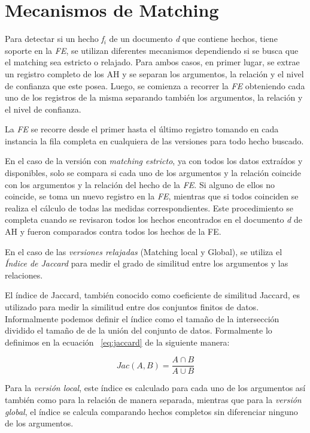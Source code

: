 \section{Mecanismos de Matching}
Para detectar si un hecho \emph{f${_i}$} de un documento \emph{d} que contiene hechos, tiene soporte en la \emph{FE}, se utilizan diferentes mecanismos dependiendo si se busca que el matching sea estricto o relajado.
Para ambos casos, en primer lugar, se extrae un registro completo de los AH y se separan los argumentos, la relaci\'on y el nivel de confianza que este posea. Luego, se comienza a recorrer la \emph{FE} obteniendo cada uno de los registros de la misma separando tambi\'en los argumentos, la relaci\'on y el nivel de confianza.

La \emph{FE} se recorre desde el primer hasta el \'ultimo registro tomando en cada instancia la fila completa en cualquiera de las versiones para todo hecho buscado.

En el caso de la versi\'on con \emph{matching estricto}, ya con todos los datos extra\'idos y disponibles, solo se compara si cada uno de los argumentos y la relaci\'on coincide con los argumentos y la relaci\'on del hecho de la \emph{FE}. Si alguno de ellos no coincide, se toma un nuevo registro en la \emph{FE}, mientras que si todos coinciden  se realiza el c\'alculo de todas las medidas correspondientes.
Este procedimiento se completa cuando se revisaron todos los hechos encontrados en el documento \emph{d} de AH y fueron comparados contra todos los hechos de la FE.

En el caso de las \emph{versiones relajadas} (Matching local y Global), se utiliza el \emph{Índice de Jaccard} para medir el grado de similitud entre los argumentos y las relaciones.

El \'indice de Jaccard, tambi\'en conocido como coeficiente de similitud Jaccard, es utilizado para medir la similitud entre dos conjuntos finitos de datos. Informalmente podemos definir el \'indice como el tama\~no de la intersecci\'on dividido el tama\~no de de la uni\'on del conjunto de datos. Formalmente lo definimos en la ecuaci\'on ~\ref{eq:jaccard} de la siguiente manera:

\begin{equation}
	\label{eq:jaccard}
           Jac(A,B) = \frac {A \cap B} {A \cup B}
\end{equation}

Para la \emph{versi\'on local}, este \'indice es calculado para cada uno de los argumentos as\'i tambi\'en como para la relaci\'on de manera separada, mientras que para la \emph{versi\'on global}, el \'indice se calcula comparando hechos completos sin diferenciar ninguno de los argumentos.

